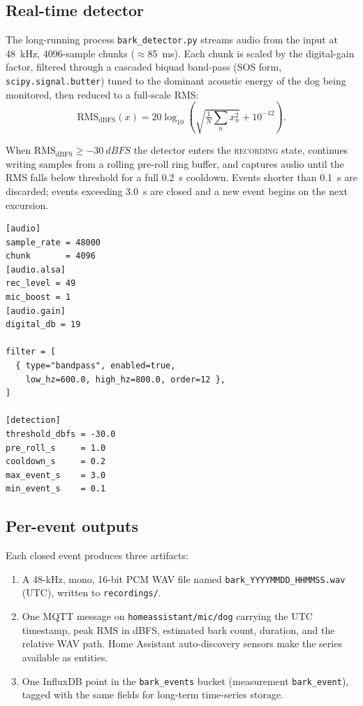 \documentclass[10pt,twocolumn]{article}
\begin{document}
\subsection{Real-time detector}
The long-running process \texttt{bark\_detector.py} streams audio from
the input at \SI{48}{kHz}, \num{4096}-sample chunks ($\approx$\SI{85}{ms}).
Each chunk is scaled by the digital-gain factor, filtered through a
cascaded biquad band-pass (SOS form, \texttt{scipy.signal.butter})
tuned to the dominant acoustic energy of the dog being monitored, then
reduced to a full-scale RMS:
\begin{equation}
  \text{RMS}_\text{dBFS}(x) = 20 \log_{10}\!
  \left( \sqrt{\tfrac{1}{N}\sum_n x_n^2} + 10^{-12} \right).
\end{equation}

When $\text{RMS}_\text{dBFS} \geq -\SI{30}{dBFS}$ the detector enters
the \textsc{recording} state, continues writing samples from a
rolling pre-roll ring buffer, and captures audio until the RMS falls
below threshold for a full \SI{0.2}{s} cooldown. Events shorter than
\SI{0.1}{s} are discarded; events exceeding \SI{3.0}{s} are closed and
a new event begins on the next excursion.

\begin{lstlisting}[caption={\texttt{config.toml} (detector).},
                   label={lst:config},float=t]
[audio]
sample_rate = 48000
chunk       = 4096
[audio.alsa]
rec_level = 49
mic_boost = 1
[audio.gain]
digital_db = 19

filter = [
  { type="bandpass", enabled=true,
    low_hz=600.0, high_hz=800.0, order=12 },
]

[detection]
threshold_dbfs = -30.0
pre_roll_s     = 1.0
cooldown_s     = 0.2
max_event_s    = 3.0
min_event_s    = 0.1
\end{lstlisting}

\subsection{Per-event outputs}
Each closed event produces three artifacts:
\begin{enumerate}
  \item A \num{48}-kHz, mono, \num{16}-bit PCM WAV file named
        \texttt{bark\_YYYYMMDD\_HHMMSS.wav} (UTC), written to
        \texttt{recordings/}.
  \item One MQTT message on \texttt{homeassistant/mic/dog} carrying the
        UTC timestamp, peak RMS in dBFS, estimated bark count, duration,
        and the relative WAV path. Home Assistant auto-discovery sensors
        make the series available as entities.
  \item One InfluxDB point in the \texttt{bark\_events} bucket
        (measurement \texttt{bark\_event}), tagged with the same fields
        for long-term time-series storage.
\end{enumerate}
\end{document}
